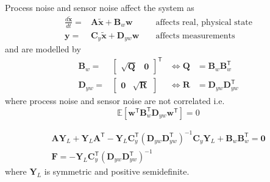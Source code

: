 \newpar{}

Process noise and sensor noise affect the system as
\begin{align*}
    \frac{d\tilde{\mathbf{x}} }{dt}= & \mathbf{A}\tilde{\mathbf{x}}+\mathbf{B}_{w} \mathbf{w}   &  & \text{ affects real, physical state} \\
    \mathbf{y}=                      & \mathbf{C}_y\tilde{\mathbf{x}}+\mathbf{D}_{yw}\mathbf{w} &  & \text{ affects measurements}
\end{align*}
and are modelled by
\begin{align*}
    \mathbf{B}_w=    & \begin{bmatrix}\sqrt{\mathbf{Q}}&\mathbf{0}\end{bmatrix}^{\mathsf{T}} & \Leftrightarrow \mathbf{Q}          & = \mathbf{B}_w\mathbf{B}_w^{\mathsf{T}}       \\
    \mathbf{D}_{yw}= & \begin{bmatrix}\mathbf{0}&\sqrt{\mathbf{R}}\end{bmatrix}              & \Leftrightarrow \mathbf{\mathbf{R}} & = \mathbf{D}_{yw}\mathbf{D}_{yw}^{\mathsf{T}}
\end{align*}
where process noise and sensor noise are not correlated i.e.
\begin{equation*}
    \mathbb{E}\left[\mathbf{w}^{\mathsf{T}} \mathbf{B}_w^{\mathsf{T}} \mathbf{D}_{yw}\mathbf{w}^{\mathsf{T}}\right]=0
\end{equation*}

\newpar{}
\noindent\begin{gather*}
    \mathbf{A}\mathbf{Y}_L + \mathbf{Y}_L \mathbf{A}^{\mathsf{T}} - \mathbf{Y}_L \mathbf{C}_y^{\mathsf{T}}{\left(\mathbf{D}_{yw}\mathbf{D}_{yw}^{\mathsf{T}}\right)}^{-1} \mathbf{C}_y \mathbf{Y}_L + \mathbf{B}_w\mathbf{B}_w^{\mathsf{T}} = \mathbf{0}\\
    \mathbf{F} = -\mathbf{Y}_L\mathbf{C}_y^{\mathsf{T}}{\left(\mathbf{D}_{yw}\mathbf{D}_{yw}^{\mathsf{T}}\right)}^{-1}
\end{gather*}
where $\mathbf{Y}_L$ is symmetric and positive semidefinite.

\newpar{}

